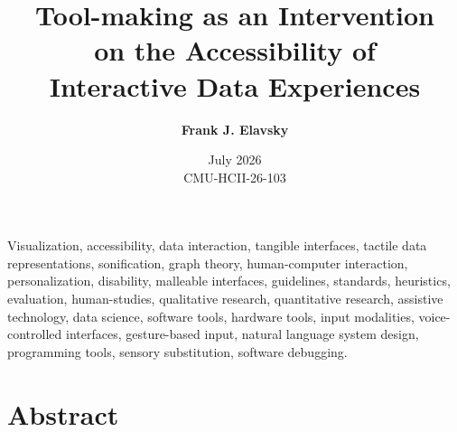 \documentclass[12pt]{cmuthesis}
\begin{document}
 
\frontmatter

\pagestyle{empty}

\title{
{\bf Tool-making as an Intervention\\ on the Accessibility of \\Interactive Data Experiences}}

\author{\bf Frank J. Elavsky}
\date{July 2026 \\CMU-HCII-26-103}



\maketitle
\begin{keywords}
Visualization, accessibility, data interaction, tangible interfaces, tactile data representations, sonification, graph theory, human-computer interaction, personalization, disability, malleable interfaces, guidelines, standards, heuristics, evaluation, human-studies, qualitative research, quantitative research, assistive technology, data science, software tools, hardware tools, input modalities, voice-controlled interfaces, gesture-based input, natural language system design, programming tools, sensory substitution, software debugging.
\end{keywords}

\pagestyle{plain} %

\clearpage

\tableofcontents
\listoffigures

\chapter*{Abstract}
\end{document}
